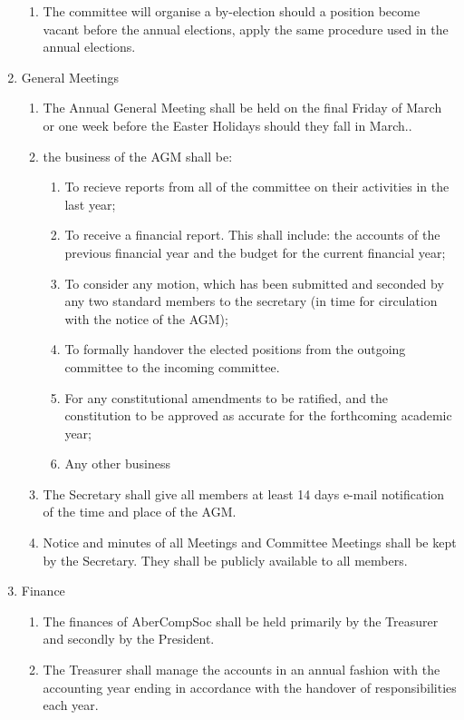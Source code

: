 \documentclass{article}
\begin{document}
\begin{enumerate}
\begin{enumerate}
            \item The committee will organise a by-election should a position become vacant before the annual elections, apply the same procedure used in the annual elections.
        \end{enumerate}
    \item General Meetings
        \begin{enumerate}
            \item The Annual General Meeting shall be held on the final Friday of March or one week before the Easter Holidays should they fall in March..
            \item the business of the AGM shall be:
                \begin{enumerate}
                    \item To recieve reports from all of the committee on their activities in the last year;
                    \item To receive a financial report. This shall include: the accounts of the previous financial year and the budget for the current financial year;
                    \item To consider any motion, which has been submitted and seconded by any two standard members to the secretary (in time for circulation with the notice of the AGM);
                    \item To formally handover the elected positions from the outgoing committee to the incoming committee.
                    \item For any constitutional amendments to be ratified, and the constitution to be approved as accurate for the forthcoming academic year;
                    \item Any other business
                \end{enumerate}
            \item The Secretary shall give all members at least 14 days e-mail notification of the time and place of the AGM.
            \item Notice and minutes of all Meetings and Committee Meetings shall be kept by the Secretary. They shall be publicly available to all members.
        \end{enumerate}
    \item Finance
        \begin{enumerate}
            \item The finances of AberCompSoc shall be held primarily by the Treasurer and secondly by the President.
            \item The Treasurer shall manage the accounts in an annual fashion with the accounting year ending in accordance with the handover of responsibilities each year.

\end{enumerate}
\end{enumerate}
\end{document}
